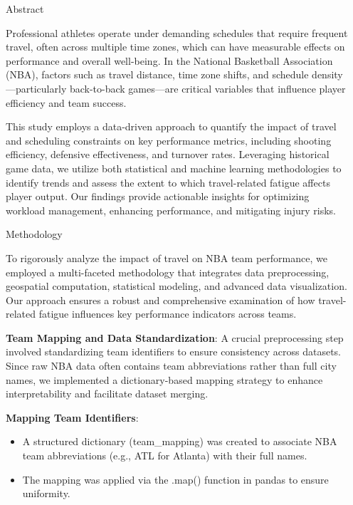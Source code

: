 \documentclass[final]{beamer}
\newlength{\sepwidth}
\newlength{\colwidth}
\newcommand{\separatorcolumn}{\begin{column}{\sepwidth}\end{column}}
\begin{document}
\begin{frame}[t]
\begin{columns}[t]
\separatorcolumn

\begin{column}{\colwidth}

  \begin{block}{Abstract}

  
Professional athletes operate under demanding schedules that require frequent travel, often across multiple time zones, which can have measurable effects on performance and overall well-being. In the National Basketball Association (NBA), factors such as travel distance, time zone shifts, and schedule density—particularly back-to-back games—are critical variables that influence player efficiency and team success.

This study employs a data-driven approach to quantify the impact of travel and scheduling constraints on key performance metrics, including shooting efficiency, defensive effectiveness, and turnover rates. Leveraging historical game data, we utilize both statistical and machine learning methodologies to identify trends and assess the extent to which travel-related fatigue affects player output. Our findings provide actionable insights for optimizing workload management, enhancing performance, and mitigating injury risks.



  \end{block}

\begin{block}{Methodology}

To rigorously analyze the impact of travel on NBA team performance, we employed a multi-faceted methodology that integrates data preprocessing, geospatial computation, statistical modeling, and advanced data visualization. Our approach ensures a robust and comprehensive examination of how travel-related fatigue influences key performance indicators across teams.

\textbf{Team Mapping and Data Standardization}: A crucial preprocessing step involved standardizing team identifiers to ensure consistency across datasets. Since raw NBA data often contains team abbreviations rather than full city names, we implemented a dictionary-based mapping strategy to enhance interpretability and facilitate dataset merging.

\textbf{Mapping Team Identifiers}:
\begin{itemize}
  \item A structured dictionary (team\_mapping) was created to associate NBA team abbreviations (e.g., ATL for Atlanta) with their full names.
  \item The mapping was applied via the .map() function in pandas to ensure uniformity.
\end{itemize}


\end{block}
\end{column}
\end{columns}
\end{frame}
\end{document}
